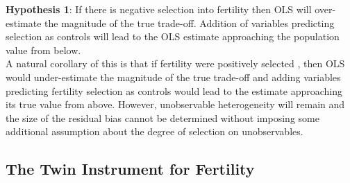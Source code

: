 \documentclass[subeqn]{article}
\begin{document}
\begin{spacing}{1.4}

\noindent %
\textbf{Hypothesis 1}: If there is negative selection into fertility then OLS will over-estimate the magnitude of the true trade-off. Addition of variables predicting selection as controls will lead to the OLS estimate approaching the population value from below.\\
A natural corollary of this is that if fertility were positively selected \citep{Fortetal2016,Myrskylaetal2009}, then OLS would under-estimate the magnitude of the true trade-off and adding variables predicting fertility selection as controls would lead to the estimate approaching its true value from above. However, unobservable heterogeneity will remain and the size of the residual bias cannot be determined without imposing some additional assumption about the degree of selection on unobservables.


\subsection{The Twin Instrument for Fertility}
\label{sscn:validIV}



\end{spacing}
\end{document}
